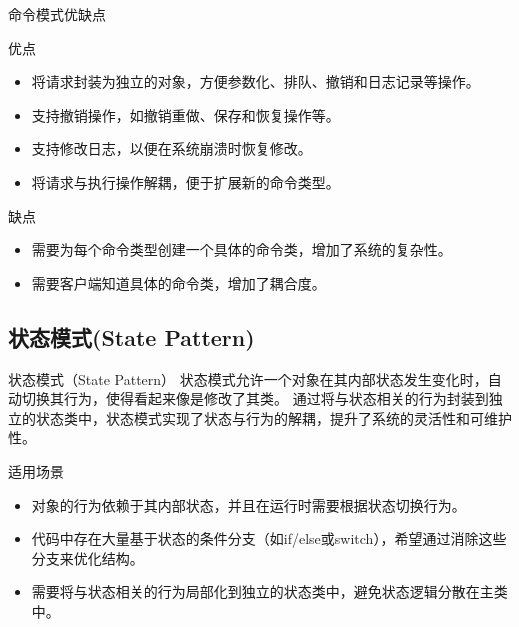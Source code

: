 \documentclass[UTF8,aspectratio=169]{beamer}
\begin{document}
\begin{frame}{命令模式优缺点}
    \begin{ytublock}{优点}
        \begin{itemize}
            \item 将请求封装为独立的对象，方便参数化、排队、撤销和日志记录等操作。
            \item 支持撤销操作，如撤销重做、保存和恢复操作等。
            \item 支持修改日志，以便在系统崩溃时恢复修改。
            \item 将请求与执行操作解耦，便于扩展新的命令类型。
        \end{itemize}
    \end{ytublock}
    \begin{alertytublock}{缺点}
        \begin{itemize}
            \item 需要为每个命令类型创建一个具体的命令类，增加了系统的复杂性。
            \item 需要客户端知道具体的命令类，增加了耦合度。
        \end{itemize}
    \end{alertytublock}
\end{frame}

\subsection{状态模式(State Pattern)}

\begin{frame}{状态模式（State Pattern）}
    状态模式允许一个对象在其内部状态发生变化时，自动切换其行为，使得看起来像是修改了其类。
    通过将与状态相关的行为封装到独立的状态类中，状态模式实现了状态与行为的解耦，提升了系统的灵活性和可维护性。

    \begin{ytublock}{适用场景}
        \begin{itemize}
            \item 对象的行为依赖于其内部状态，并且在运行时需要根据状态切换行为。
            \item 代码中存在大量基于状态的条件分支（如if/else或switch），希望通过消除这些分支来优化结构。
            \item 需要将与状态相关的行为局部化到独立的状态类中，避免状态逻辑分散在主类中。
        \end{itemize}
    \end{ytublock}
\end{frame}
\end{document}

